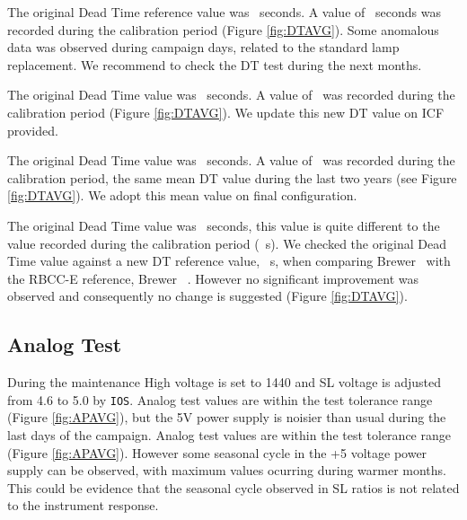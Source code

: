 \noindent The original Dead Time reference value was \textbf{\DTorig}\ seconds. A value of \textbf{\DTAVG}\ seconds was recorded during the calibration period (Figure \ref{fig:DTAVG}). Some anomalous data was observed during campaign days, related to the standard lamp replacement. We recommend to check the DT test during the next months.

\noindent The original Dead Time value was \textbf{\DTorig}\ seconds. A value of \textbf{\DTAVG}\ was recorded during the calibration period (Figure \ref{fig:DTAVG}). We update this new DT value on ICF provided.

\noindent The original Dead Time value was \textbf{\DTorig}\ seconds. A value of \textbf{\DTAVG}\ was recorded during the calibration period, the same mean DT value during the last two years (see Figure \ref{fig:DTAVG}). We adopt this mean value on final configuration.

\noindent The original Dead Time value was \textbf{\DTorig}\ seconds, this value is quite different to the value recorded during the calibration period (\textbf{\DTAVG}\ s). We checked the original Dead Time value against a new DT reference value, \ s, when comparing Brewer \brwname\ with the RBCC-E reference, Brewer \brwref\ . However no significant improvement was observed and consequently no change is suggested (Figure \ref{fig:DTAVG}).


\subsection{Analog Test} \label{subsec:AP}
During the maintenance High voltage is set to 1440 and SL voltage is adjusted from 4.6 to 5.0 by \texttt{IOS}.
Analog test values are within the test tolerance range (Figure \ref{fig:APAVG}), but the 5V power supply is noisier than usual during the last days of the campaign.
Analog test values are within the test tolerance range (Figure \ref{fig:APAVG}). However some seasonal cycle in the +5 voltage power supply can be observed, with maximum values ocurring during warmer months. This could be evidence that the seasonal cycle observed in SL ratios is not related to the instrument response.




